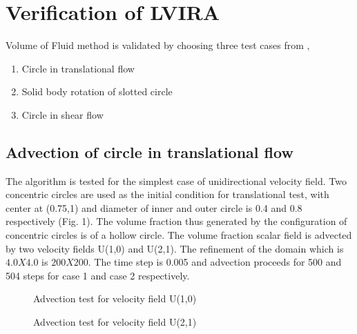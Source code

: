 


\section{Verification of LVIRA}

Volume of Fluid method is validated by choosing three test cases from \cite{Rudman1997}, 

\begin{enumerate}
 \item Circle in translational flow
 \item Solid body rotation of slotted circle
 \item Circle in shear flow
\end{enumerate}

\subsection{Advection of circle in translational flow}
The algorithm is tested for the simplest case of unidirectional velocity field. Two concentric circles are used as the initial 
condition for translational test, with center at (0.75,1) and diameter of inner and outer circle is 0.4 and 0.8 respectively (Fig. 1).
The volume fraction thus generated by the configuration of concentric circles is of a hollow circle. The volume fraction scalar
field is advected by two velocity fields U(1,0) and U(2,1). The refinement of the domain which is $4.0X4.0$ is $200X200$. The time
step is 0.005 and advection proceeds for 500 and 504 steps for case 1 and case 2 respectively.

\begin{figure}[H]
 \centering
 \caption{Advection test for velocity field U(1,0)}
\end{figure}

\begin{figure}[H]
 \centering
 \caption{Advection test for velocity field U(2,1)}
\end{figure}

